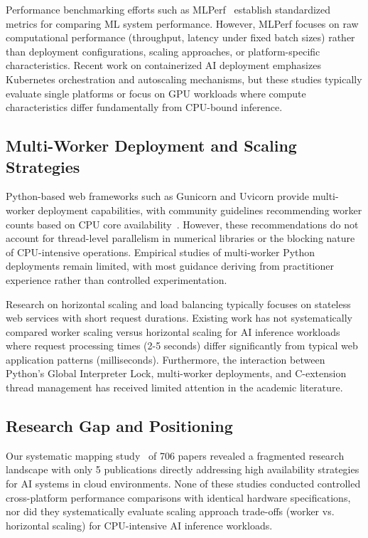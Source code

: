 Performance benchmarking efforts such as MLPerf~\cite{reddi2020mlperf} establish standardized metrics for comparing ML system performance. However, MLPerf focuses on raw computational performance (throughput, latency under fixed batch sizes) rather than deployment configurations, scaling approaches, or platform-specific characteristics. Recent work on containerized AI deployment emphasizes Kubernetes orchestration and autoscaling mechanisms, but these studies typically evaluate single platforms or focus on GPU workloads where compute characteristics differ fundamentally from CPU-bound inference.

\subsection{Multi-Worker Deployment and Scaling Strategies}

Python-based web frameworks such as Gunicorn and Uvicorn provide multi-worker deployment capabilities, with community guidelines recommending worker counts based on CPU core availability~\cite{gunicorn2023docs}. However, these recommendations do not account for thread-level parallelism in numerical libraries or the blocking nature of CPU-intensive operations. Empirical studies of multi-worker Python deployments remain limited, with most guidance deriving from practitioner experience rather than controlled experimentation.

Research on horizontal scaling and load balancing typically focuses on stateless web services with short request durations. Existing work has not systematically compared worker scaling versus horizontal scaling for AI inference workloads where request processing times (2-5 seconds) differ significantly from typical web application patterns (milliseconds). Furthermore, the interaction between Python's Global Interpreter Lock, multi-worker deployments, and C-extension thread management has received limited attention in the academic literature.

\subsection{Research Gap and Positioning}

Our systematic mapping study~\cite{holandabilharinhodejesus2025high} of 706 papers revealed a fragmented research landscape with only 5 publications directly addressing high availability strategies for AI systems in cloud environments. None of these studies conducted controlled cross-platform performance comparisons with identical hardware specifications, nor did they systematically evaluate scaling approach trade-offs (worker vs. horizontal scaling) for CPU-intensive AI inference workloads.

